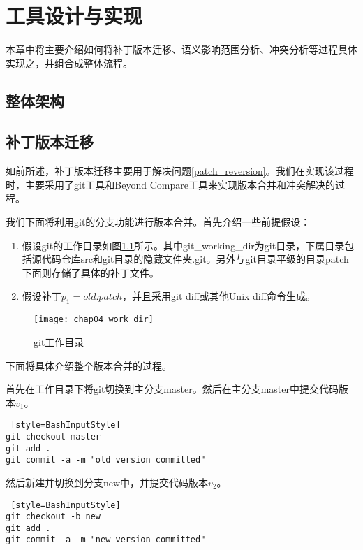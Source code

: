 \chapter{工具设计与实现}
本章中将主要介绍如何将补丁版本迁移、语义影响范围分析、冲突分析等过程具体实现之，并组合成整体流程。

\section{整体架构}

\section{补丁版本迁移}

如前所述，补丁版本迁移主要用于解决问题\ref {patch_reversion}。我们在实现该过程时，主要采用了git工具和Beyond Compare工具来实现版本合并和冲突解决的过程。

我们下面将利用git的分支功能进行版本合并。首先介绍一些前提假设：

\begin{enumerate}
	\item 假设git的工作目录如图\ref {git_work_dir}所示。其中git\_working\_dir为git目录，下属目录包括源代码仓库src和git目录的隐藏文件夹.git。另外与git目录平级的目录patch下面则存储了具体的补丁文件。

	\item 假设补丁$p_1 = old.patch$，并且采用git diff或其他Unix diff命令生成。
\end{enumerate}

\begin{figure}[H]
	\centering
	\texttt{[image: chap04\_work\_dir]}
	\caption {git工作目录}
	\label {git_work_dir}	
\end{figure}

下面将具体介绍整个版本合并的过程。


首先在工作目录下将git切换到主分支master。然后在主分支master中提交代码版本$v_1$。

\begin{lstlisting} [style=BashInputStyle]
git checkout master
git add .
git commit -a -m "old version committed"
\end{lstlisting}

然后新建并切换到分支new中，并提交代码版本$v_2$。
\begin{lstlisting} [style=BashInputStyle]
git checkout -b new
git add .
git commit -a -m "new version committed"
\end{lstlisting}

